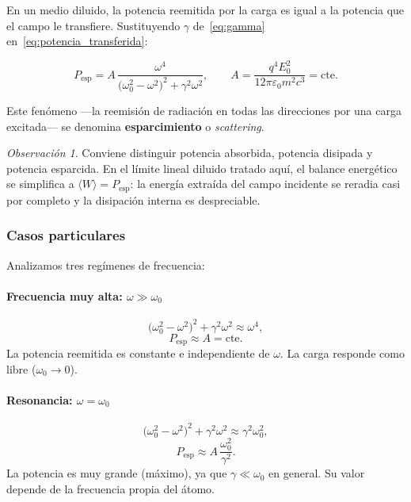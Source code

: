 \documentclass[12pt, a4paper]{article}
\theoremstyle{plain}
\theoremstyle{definition}
\theoremstyle{remark}
\newtheorem*{observacion}{Observación}
\begin{document}
En un medio diluido, la potencia reemitida por la carga es igual a la
potencia que el campo le transfiere. Sustituyendo $\gamma$ de~\eqref{eq:gamma}
en~\eqref{eq:potencia_transferida}:

\begin{mdframed}[style=resultado]
\begin{equation}
  P_\text{esp} = A\,
  \frac{\omega^4}{\bigl(\omega_0^2-\omega^2\bigr)^2+\gamma^2\omega^2},
  \qquad
  A = \frac{q^4 E_0^2}{12\pi\varepsilon_0 m^2 c^3} = \mathrm{cte}.
  \label{eq:P_esp}
\end{equation}
\end{mdframed}

Este fenómeno —la reemisión de radiación en todas las direcciones por una
carga excitada— se denomina \textbf{esparcimiento} o \emph{scattering}.

\begin{observacion}
Conviene distinguir potencia absorbida, potencia disipada y potencia esparcida.
En el límite lineal diluido tratado aquí, el balance energético se simplifica a
$\langle W\rangle = P_{\text{esp}}$: la energía extraída del campo incidente se
reradia casi por completo y la disipación interna es despreciable.
\end{observacion}

\subsubsection{Casos particulares}

Analizamos tres regímenes de frecuencia:

\paragraph{Frecuencia muy alta: $\omega\gg\omega_0$}

\[
  \bigl(\omega_0^2-\omega^2\bigr)^2+\gamma^2\omega^2 \approx \omega^4,
\]
\begin{equation}
  P_\text{esp} \approx A = \mathrm{cte}. \label{eq:P_alta_freq}
\end{equation}
La potencia reemitida es constante e independiente de $\omega$. La carga
responde como libre ($\omega_0\to 0$).

\paragraph{Resonancia: $\omega=\omega_0$}

\[
  \bigl(\omega_0^2-\omega^2\bigr)^2+\gamma^2\omega^2 \approx \gamma^2\omega_0^2,
\]
\begin{equation}
  P_\text{esp} \approx A\,\frac{\omega_0^2}{\gamma^2}. \label{eq:P_resonancia}
\end{equation}
La potencia es muy grande (máximo), ya que $\gamma\ll\omega_0$ en general.
Su valor depende de la frecuencia propia del átomo.
\end{document}
